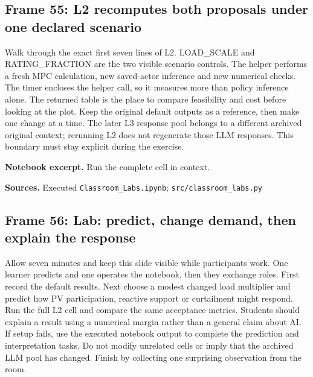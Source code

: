 \documentclass[11pt]{article}
\begin{document}
\subsection*{Frame 55: L2 recomputes both proposals under one declared scenario}
Walk through the exact first seven lines of L2. LOAD\_SCALE and RATING\_FRACTION are the two visible scenario controls. The helper performs a fresh MPC calculation, new saved-actor inference and new numerical checks. The timer encloses the helper call, so it measures more than policy inference alone. The returned table is the place to compare feasibility and cost before looking at the plot. Keep the original default outputs as a reference, then make one change at a time. The later L3 response pool belongs to a different archived original context; rerunning L2 does not regenerate those LLM responses. This boundary must stay explicit during the exercise.\par
\par\noindent\begin{minipage}{\linewidth}\textbf{Notebook excerpt.} Run the complete cell in context.\par \end{minipage}\par
\par\nopagebreak\begin{minipage}{\linewidth}{\footnotesize\color{slate}\textbf{Sources.} Executed \texttt{Classroom\_Labs.ipynb}; \texttt{src/classroom\_labs.py}\par}\end{minipage}\par\medskip
\subsection*{Frame 56: Lab: predict, change demand, then explain the response}
Allow seven minutes and keep this slide visible while participants work. One learner predicts and one operates the notebook, then they exchange roles. First record the default results. Next choose a modest changed load multiplier and predict how PV participation, reactive support or curtailment might respond. Run the full L2 cell and compare the same acceptance metrics. Students should explain a result using a numerical margin rather than a general claim about AI. If setup fails, use the executed notebook output to complete the prediction and interpretation tasks. Do not modify unrelated cells or imply that the archived LLM pool has changed. Finish by collecting one surprising observation from the room.\par
\end{document}
